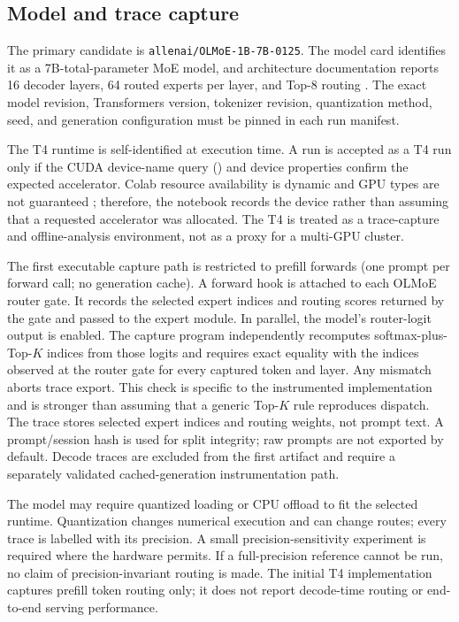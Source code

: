 \documentclass[a4paper,preprint,review,12pt,authoryear]{elsarticle}
\begin{document}
\subsection{Model and trace capture}

The primary candidate is \texttt{allenai/OLMoE-1B-7B-0125}. The model card identifies it as a 7B-total-parameter MoE model, and architecture documentation reports 16 decoder layers, 64 routed experts per layer, and Top-8 routing \citep{muennighoff2024olmoe,nvidia2025olmoe}. The exact model revision, Transformers version, tokenizer revision, quantization method, seed, and generation configuration must be pinned in each run manifest.

The T4 runtime is self-identified at execution time. A run is accepted as a T4 run only if the CUDA device-name query () and device properties confirm the expected accelerator. Colab resource availability is dynamic and GPU types are not guaranteed \citep{google2026colabfaq}; therefore, the notebook records the device rather than assuming that a requested accelerator was allocated. The T4 is treated as a trace-capture and offline-analysis environment, not as a proxy for a multi-GPU cluster.

The first executable capture path is restricted to prefill forwards (one prompt per forward call; no generation cache). A forward hook is attached to each OLMoE router gate. It records the selected expert indices and routing scores returned by the gate and passed to the expert module. In parallel, the model's router-logit output is enabled. The capture program independently recomputes softmax-plus-Top-$K$ indices from those logits and requires exact equality with the indices observed at the router gate for every captured token and layer. Any mismatch aborts trace export. This check is specific to the instrumented implementation and is stronger than assuming that a generic Top-$K$ rule reproduces dispatch. The trace stores selected expert indices and routing weights, not prompt text. A prompt/session hash is used for split integrity; raw prompts are not exported by default. Decode traces are excluded from the first artifact and require a separately validated cached-generation instrumentation path.

The model may require quantized loading or CPU offload to fit the selected runtime. Quantization changes numerical execution and can change routes; every trace is labelled with its precision. A small precision-sensitivity experiment is required where the hardware permits. If a full-precision reference cannot be run, no claim of precision-invariant routing is made. The initial T4 implementation captures prefill token routing only; it does not report decode-time routing or end-to-end serving performance.
\end{document}
